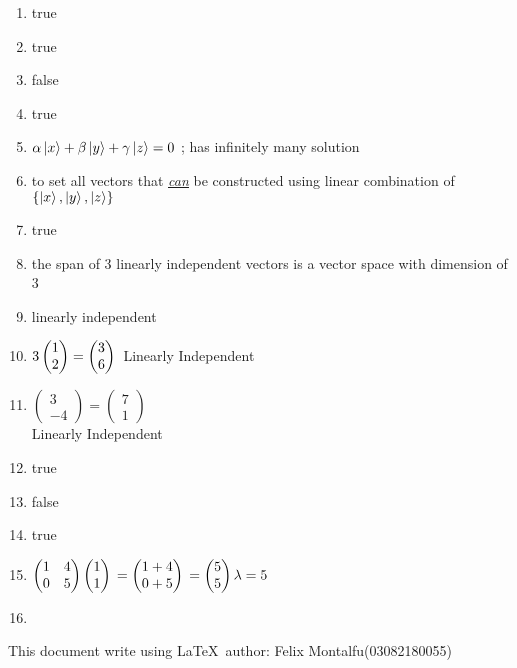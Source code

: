 \documentclass[a4paper]{article}
\begin{document}
  \begin{enumerate}[1.]
    \item true
    \item true
    \item false
    \item true
    \item $\alpha \ket{x} + \beta \ket{y} + \gamma \ket{z} = 0$ \hspace{0.5px}; has infinitely many solution
    \item to set all vectors that \emph{\underline{\underline{can}}} be constructed using linear combination of $\left\{\ket{x},\ket{y},\ket{z}\right\}$
    \item true
    \item the span of 3 linearly independent vectors is a vector space with dimension of 3
    \item linearly independent
    \item $3\begin{pmatrix}1 \\ 2\end{pmatrix} = \begin{pmatrix}3 \\ 6\end{pmatrix}\\$ Linearly Independent
    \item $\begin{pmatrix}3 \\ -4\end{pmatrix} = \begin{pmatrix}7 \\ 1\end{pmatrix}$\\ Linearly Independent
    \item true
    \item false
    \item true
    \item $\begin{pmatrix}1 & 4 \\ 0 & 5\end{pmatrix}\begin{pmatrix}1 \\ 1\end{pmatrix}\\
    =\begin{pmatrix}1+4 \\ 0+5\end{pmatrix}\\
    =\begin{pmatrix}5 \\ 5\end{pmatrix}\\
    \lambda = 5$
    \item 
  \end{enumerate}
  This document write using \LaTeX \ author: Felix Montalfu(03082180055) 
\end{document}
